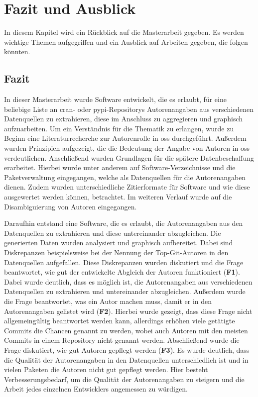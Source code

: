 \chapter{Fazit und Ausblick}
\label{cap:fazit_ausblick}
In diesem Kapitel wird ein Rückblick auf die Masterarbeit gegeben. Es werden wichtige Themen aufgegriffen und ein Ausblick auf Arbeiten gegeben, die folgen könnten.

\section{Fazit}
\label{sec:fazit}
In dieser Masterarbeit wurde Software entwickelt, die es erlaubt, für eine beliebige Liste an \gls{cran}- oder \gls{pypi}-Repositorys Autorenangaben aus verschiedenen Datenquellen zu extrahieren, diese im Anschluss zu aggregieren und graphisch aufzuarbeiten.
Um ein Verständnis für die Thematik zu erlangen, wurde zu Beginn eine Literaturrecherche zur Autorenrolle in \gls{oss} durchgeführt.
Außerdem wurden Prinzipien aufgezeigt, die die Bedeutung der Angabe von Autoren in \gls{oss} verdeutlichen.
Anschließend wurden Grundlagen für die spätere Datenbeschaffung erarbeitet.
Hierbei wurde unter anderem auf Software-Verzeichnisse und die Paketverwaltung eingegangen, welche als Datenquellen für die Autorenangaben dienen.
Zudem wurden unterschiedliche Zitierformate für Software und wie diese ausgewertet werden können, betrachtet.
Im weiteren Verlauf wurde auf die Disambiguierung von Autoren eingegangen.

Daraufhin entstand eine Software, die es erlaubt, die Autorenangaben aus den Datenquellen zu extrahieren und diese untereinander abzugleichen.
Die generierten Daten wurden analysiert und graphisch aufbereitet.
Dabei sind Diskrepanzen beispielsweise bei der Nennung der Top-Git-Autoren in den Datenquellen aufgefallen.
Diese Diskrepanzen wurden diskutiert und die Frage beantwortet, wie gut der entwickelte Abgleich der Autoren funktioniert (\textbf{F1}).
Dabei wurde deutlich, dass es möglich ist, die Autorenangaben aus verschiedenen Datenquellen zu extrahieren und untereinander abzugleichen.
Außerdem wurde die Frage beantwortet, was ein Autor machen muss, damit er in den Autorenangaben gelistet wird (\textbf{F2}).
Hierbei wurde gezeigt, dass diese Frage nicht allgemeingültig beantwortet werden kann, allerdings erhöhen viele getätigte Commits die Chancen genannt zu werden, wobei auch Autoren mit den meisten Commits in einem Repository nicht genannt werden.
Abschließend wurde die Frage diskutiert, wie gut Autoren gepflegt werden (\textbf{F3}).
Es wurde deutlich, dass die Qualität der Autorenangaben in den Datenquellen unterschiedlich ist und in vielen Paketen die Autoren nicht gut gepflegt werden.
Hier besteht Verbesserungsbedarf, um die Qualität der Autorenangaben zu steigern und die Arbeit jedes einzelnen Entwicklers angemessen zu würdigen.

